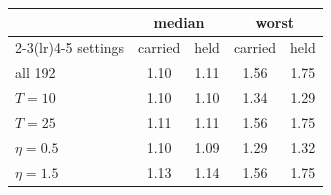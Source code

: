 \footnotesize
\setlength{\tabcolsep}{3pt}
\begin{tabular}{@{}lcccc@{}}
\toprule
& \multicolumn{2}{c}{median} & \multicolumn{2}{c}{worst} \\
\cmidrule(lr){2-3}\cmidrule(lr){4-5}
settings & carried & held & carried & held \\
\midrule
all 192 & 1.10 & 1.11 & 1.56 & 1.75 \\
\quad $T = 10$ & 1.10 & 1.10 & 1.34 & 1.29 \\
\quad $T = 25$ & 1.11 & 1.11 & 1.56 & 1.75 \\
\quad $\eta = 0.5$ & 1.10 & 1.09 & 1.29 & 1.32 \\
\quad $\eta = 1.5$ & 1.13 & 1.14 & 1.56 & 1.75 \\
\bottomrule
\end{tabular}